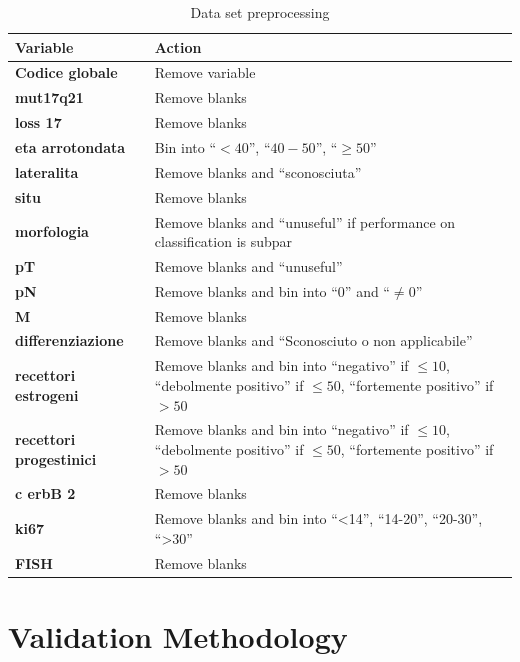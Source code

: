\begin{table}[htbp]
\caption{Data set preprocessing}
\begin{tabularx}{\textwidth}{@{} l Y @{}}
\toprule 
\textbf{Variable} & Action \\
\midrule 
\textbf{Codice globale} & Remove variable \\
\textbf{mut17q21} & Remove blanks \\
\textbf{loss 17} & Remove blanks \\
\textbf{eta arrotondata} & Bin into \enquote{$< 40$}, \enquote{$40-50$}, \enquote{$\geq 50$}\\
\textbf{lateralita} & Remove blanks and \enquote{sconosciuta} \\
\textbf{situ} & Remove blanks \\ \addlinespace
\textbf{morfologia} & Remove blanks and \enquote{unuseful} if performance on classification is subpar \\ \addlinespace
\textbf{pT} & Remove blanks and \enquote{unuseful}  \\
\textbf{pN} & Remove blanks and bin into \enquote{0} and \enquote{$\neq0$}\\
\textbf{M} & Remove blanks \\ 
\textbf{differenziazione} & Remove blanks and \enquote{Sconosciuto o non applicabile} \\ \addlinespace
\textbf{recettori estrogeni} & Remove blanks and bin into \enquote{negativo} if $\leq 10$,
		\enquote{debolmente positivo} if $\leq 50$, 
		\enquote{fortemente positivo} if $> 50$ \\ \addlinespace
\textbf{recettori progestinici} & Remove blanks and bin into \enquote{negativo} if $\leq 10$, 
		\enquote{debolmente positivo} if $\leq 50$, 
		\enquote{fortemente positivo} if $> 50$ \\ \addlinespace
\textbf{c erbB 2} & Remove blanks \\ 
\textbf{ki67} & Remove blanks and bin into \enquote{<14}, 
		\enquote{14-20}, \enquote{20-30}, \enquote{>30} \\ 
\textbf{FISH} & Remove blanks \\
\bottomrule
\end{tabularx}
\label{tab:datasetpreprocess}
\end{table}

\section{Validation Methodology}





